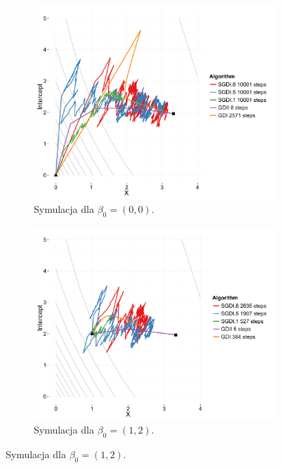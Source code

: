 \begin{figure}[h!]
  \begin{center}
   \begin{subfigure}[h!]{0.45\textwidth}
     \includegraphics[width=\textwidth]{Obrazki/contour_00.pdf}
     \caption{Symulacja dla $\beta_0 = (0,0)$.}
   \end{subfigure}
   \begin{subfigure}[h!]{0.45\textwidth}
        \includegraphics[width=\textwidth]{Obrazki/contour_2_1.pdf}
        \caption{Symulacja dla $\beta_0 = (1,2)$.}

\end{subfigure}
\end{center}
\end{figure}
